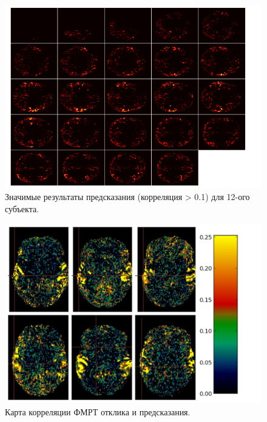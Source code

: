 \documentclass[pdftex,ptm,12pt,a4paper]{report}
\theoremstyle{definition}
\begin{document}
\begin{figure}[h]
\includegraphics[scale=0.65]{graphics/sub12_trunk01.png}
\centering
\caption{Значимые результаты предсказания (корреляция > 0.1) для 12-ого субъекта.}
\label{sub12_mosaic}
\end{figure}

\begin{figure}[h]
\includegraphics[scale=0.4]{images/all_6.png}
\centering
\caption{Карта корреляции ФМРТ отклика и предсказания.}
\label{slices}
\end{figure}
\end{document}
